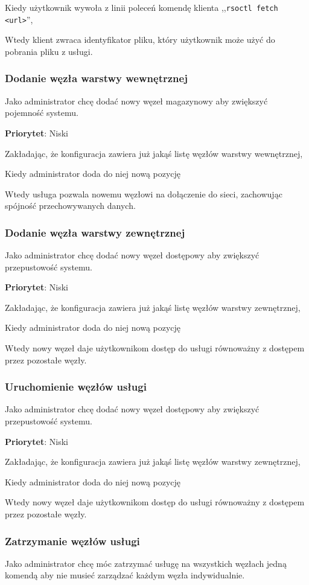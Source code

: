 \documentclass[a4paper,11pt]{article}
\begin{document}
Kiedy użytkownik wywoła z linii poleceń komendę klienta ,,\texttt{rsoctl
fetch <url>}'',

Wtedy klient zwraca identyfikator pliku, który użytkownik może użyć do
pobrania pliku z usługi.

\subsubsection{Dodanie węzła warstwy wewnętrznej}
Jako administrator chcę dodać nowy węzeł magazynowy aby zwiększyć
pojemność systemu.

\textbf{Priorytet}: Niski

Zakładając, że konfiguracja zawiera już jakąś listę węzłów warstwy
wewnętrznej,

Kiedy administrator doda do niej nową pozycję

Wtedy usługa pozwala nowemu węzłowi na dołączenie do sieci, zachowując
spójność przechowywanych danych.

\subsubsection{Dodanie węzła warstwy zewnętrznej}
Jako administrator chcę dodać nowy węzeł dostępowy aby zwiększyć przepustowość systemu.

\textbf{Priorytet}: Niski

Zakładając, że konfiguracja zawiera już jakąś listę węzłów warstwy zewnętrznej,

Kiedy administrator doda do niej nową pozycję

Wtedy nowy węzeł daje użytkownikom dostęp do usługi równoważny z dostępem przez pozostałe węzły.

\subsubsection{Uruchomienie węzłów usługi}
Jako administrator chcę dodać nowy węzeł dostępowy aby zwiększyć przepustowość systemu.

\textbf{Priorytet}: Niski

Zakładając, że konfiguracja zawiera już jakąś listę węzłów warstwy zewnętrznej,

Kiedy administrator doda do niej nową pozycję

Wtedy nowy węzeł daje użytkownikom dostęp do usługi równoważny z dostępem przez pozostałe węzły.

\subsubsection{Zatrzymanie węzłów usługi}
Jako administrator chcę móc zatrzymać usługę na wszystkich węzłach jedną komendą aby nie musieć zarządzać każdym węzła indywidualnie.
\end{document}

